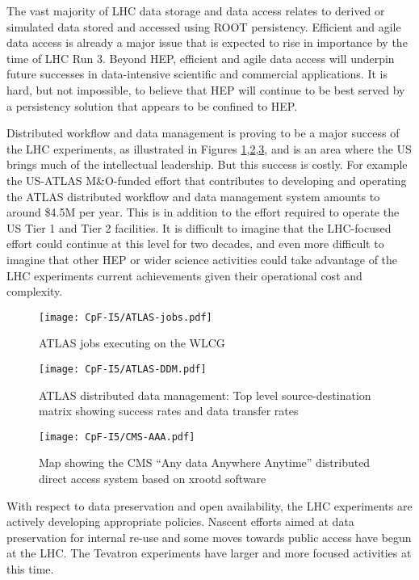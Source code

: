The vast majority of LHC data storage and data access relates to derived or simulated 
data stored and accessed using ROOT\cite{Antcheva:2009zz} persistency\cite{Canal:2011zz}.  Efficient and agile data access is 
already a major issue that is expected to rise in importance by the time of LHC Run 3.  
Beyond HEP, efficient and agile data access will underpin future successes in data-intensive 
scientific and commercial applications.  It is hard, but not impossible, to believe that HEP 
will continue to be best served by a persistency solution that appears to be confined to HEP.

Distributed workflow and data management is proving to be a major success of the LHC experiments, as 
illustrated in Figures \ref{fig:atlas-jobs},\ref{fig:atlas-ddm},\ref{fig:cms-aaa}, and is an area where the US brings much of the intellectual 
leadership.  But this success is costly. For example the US-ATLAS M\&O-funded effort that 
contributes to developing and operating the ATLAS distributed workflow and data management 
system amounts to around \$4.5M per year.  This is in addition to the effort required to operate 
the US Tier 1 and Tier 2 facilities.  It is difficult to imagine that the LHC-focused effort 
could continue at this level for two decades, and even more difficult to imagine that other HEP 
or wider science activities could take advantage of the LHC experiments current achievements 
given their operational cost and complexity. 
\begin{figure}[h]
\centering
\texttt{[image: CpF-I5/ATLAS-jobs.pdf]}
\caption{ATLAS jobs executing on the WLCG}
\label{fig:atlas-jobs}
\end{figure}
\begin{figure}[h!]
\centering
\texttt{[image: CpF-I5/ATLAS-DDM.pdf]}
\caption{ATLAS distributed data management: Top level source-destination matrix showing success rates and data transfer rates}
\label{fig:atlas-ddm}
\end{figure}
\begin{figure}[h!]
\centering
\texttt{[image: CpF-I5/CMS-AAA.pdf]}
\caption{Map showing the CMS ``Any data Anywhere Anytime'' distributed direct access system based on xrootd\cite{Bauerdick:2012st} software}
\label{fig:cms-aaa}
\end{figure}

With respect to data preservation and open availability, the LHC experiments are actively 
developing appropriate policies. Nascent efforts aimed at data preservation for internal 
re-use and some moves towards public access have begun at the LHC.  The Tevatron experiments 
have larger and more focused activities at this time.

